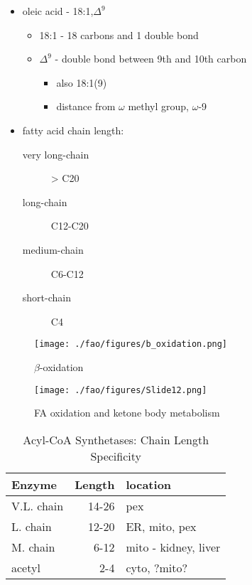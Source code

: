 \documentclass{scrartcl}
\begin{document}
\begin{itemize}
\item oleic acid - 18:1,\(\Delta^{\text{9}}\)
\begin{itemize}
\item 18:1 - 18 carbons and 1 double bond
\item \(\Delta^{\text{9}}\) - double bond between 9th and 10th carbon
\begin{itemize}
\item also 18:1(9)
\item distance from \(\omega\) methyl group, \(\omega\)-9
\end{itemize}
\end{itemize}

\item fatty acid chain length:
\begin{description}
\item[{very long-chain}] > C20
\item[{long-chain}] C12-C20
\item[{medium-chain}] C6-C12
\item[{short-chain}] C4
\end{description}
\end{itemize}

\begin{figure}[htbp]
\centering
\texttt{[image: ./fao/figures/b\_oxidation.png]}
\caption{\label{fig:org107f27c}
\(\beta\)-oxidation}
\end{figure}


\begin{figure}[htbp]
\centering
\texttt{[image: ./fao/figures/Slide12.png]}
\caption{\label{fig:org0cadb69}
FA oxidation and ketone body metabolism}
\end{figure}


\begin{table}[htbp]
\caption{\label{tab:orge600e8d}
Acyl-CoA Synthetases: Chain Length Specificity}
\centering
\begin{tabular}{lrl}
Enzyme & Length & location\\
\hline
V.L. chain & 14-26 & pex\\
L. chain & 12-20 & ER, mito, pex\\
M. chain & 6-12 & mito - kidney, liver\\
acetyl & 2-4 & cyto, ?mito?\\
\end{tabular}
\end{table}
\end{document}
